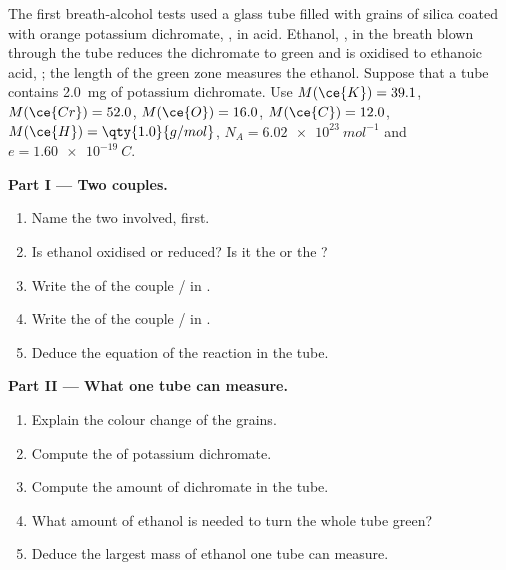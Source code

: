 \begin{problem}
\label{pb:g11:redox:1}
The first breath-alcohol tests used a glass tube filled with grains of
silica coated with orange potassium dichromate, , in acid.
Ethanol, , in the breath blown through the tube reduces the
dichromate  to green   and is oxidised to ethanoic
acid, ; the length of the green zone measures the ethanol.
Suppose that a tube contains \qty{2.0}{mg} of potassium dichromate. Use
$M(\ce{K}) = 39.1$, $M(\ce{Cr}) = 52.0$, $M(\ce{O}) = 16.0$,
$M(\ce{C}) = 12.0$, $M(\ce{H}) = \qty{1.0}{g/mol}$, $N_A =
\qty{6.02e23}{mol^{-1}}$ and $e = \qty{1.60e-19}{C}$.

\medskip
\noindent\textbf{Part I --- Two couples.}
\begin{enumerate}
  \item Name the two  involved,  first.
  \item Is ethanol oxidised or reduced? Is it the  or the
        ?
  \item Write the  of the couple
        / in .
  \item Write the  of the couple
        / in .
  \item Deduce the equation of the reaction in the tube.
\end{enumerate}

\medskip
\noindent\textbf{Part II --- What one tube can measure.}
\begin{enumerate}[resume]
  \item Explain the colour change of the grains.
  \item Compute the  of potassium dichromate.
  \item Compute the amount of dichromate  in the tube.
  \item What amount of ethanol is needed to turn the whole tube green?
  \item Deduce the largest mass of ethanol one tube can measure.
\end{enumerate}


\end{problem}
